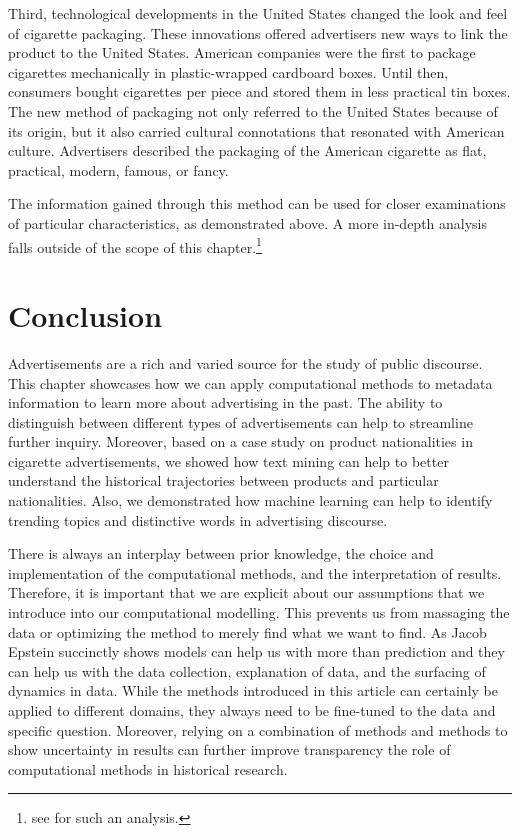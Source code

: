 \documentclass[USenglish]{article}
\begin{document}
Third, technological developments in the United States changed the look and feel of cigarette packaging. These innovations offered advertisers new ways to link the product to the United States. American companies were the first to package cigarettes mechanically in plastic-wrapped cardboard boxes. Until then, consumers bought cigarettes per piece and stored them in less practical tin boxes. The new method of packaging not only referred to the United States because of its origin, but it also carried cultural connotations that resonated with American culture. Advertisers described the packaging of the American cigarette as flat, practical, modern, famous, or fancy. 

The information gained through this method can be used for closer examinations of particular characteristics, as demonstrated above. A more in-depth analysis falls outside of the scope of this chapter.\footnote{see \cite{wevers_consuming_2017-1} for such an analysis.}

\section{Conclusion}
Advertisements are a rich and varied source for the study of public discourse. This chapter showcases how we can apply computational methods to metadata information to learn more about advertising in the past. The ability to distinguish between different types of advertisements can help to streamline further inquiry. Moreover, based on a case study on product nationalities in cigarette advertisements, we showed how text mining can help to better understand the historical trajectories between products and particular nationalities. Also, we demonstrated how machine learning can help to identify trending topics and distinctive words in advertising discourse. 

There is always an interplay between prior knowledge, the choice and implementation of the computational methods, and the interpretation of results. Therefore, it is important that we are explicit about our assumptions that we introduce into our computational modelling. This prevents us from massaging the data or optimizing the method to merely find what we want to find. As Jacob Epstein succinctly shows models can help us with more than prediction and they can help us with the data collection, explanation of data, and the surfacing of dynamics in data. While the methods introduced in this article can certainly be applied to different domains, they always need to be fine-tuned to the data and specific question. Moreover, relying on a combination of methods and methods to show uncertainty in results can further improve transparency the role of computational methods in historical research.   
\end{document}
